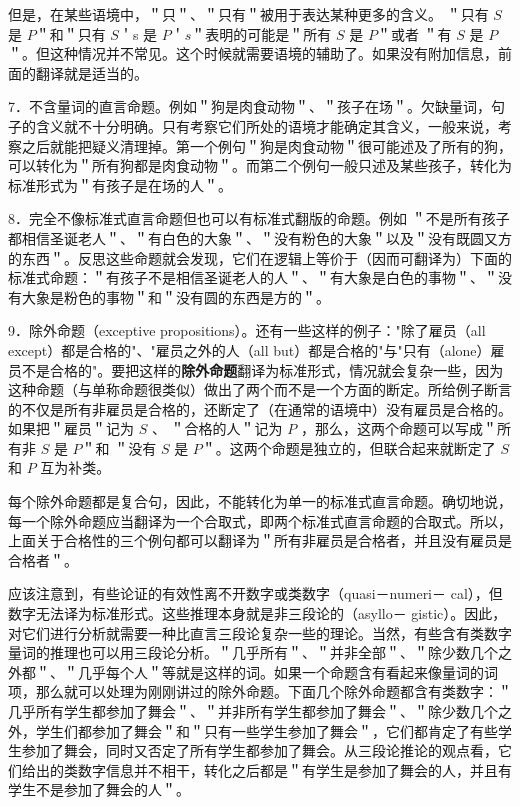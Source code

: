 但是，在某些语境中，＂只＂、＂只有＂被用于表达某种更多的含义。 ＂只有 $S$ 是 $P$＂和＂只有 $S$＇s 是 $P$＇$s$＂表明的可能是＂所有 $S$ 是 $P$＂或者 ＂有 $S$ 是 $P$＂。但这种情况并不常见。这个时候就需要语境的辅助了。如果没有附加信息，前面的翻译就是适当的。

7．不含量词的直言命题。例如＂狗是肉食动物＂、＂孩子在场＂。欠缺量词，句子的含义就不十分明确。只有考察它们所处的语境才能确定其含义，一般来说，考察之后就能把疑义清理掉。第一个例句＂狗是肉食动物＂很可能述及了所有的狗，可以转化为＂所有狗都是肉食动物＂。而第二个例句一般只述及某些孩子，转化为标准形式为＂有孩子是在场的人＂。

8．完全不像标准式直言命题但也可以有标准式翻版的命题。例如 ＂不是所有孩子都相信圣诞老人＂、＂有白色的大象＂、＂没有粉色的大象＂以及＂没有既圆又方的东西＂。反思这些命题就会发现，它们在逻辑上等价于（因而可翻译为）下面的标准式命题：＂有孩子不是相信圣诞老人的人＂、＂有大象是白色的事物＂、＂没有大象是粉色的事物＂和＂没有圆的东西是方的＂。

9．除外命题（exceptive propositions）。还有一些这样的例子："除了雇员（all except）都是合格的"、"雇员之外的人（all but）都是合格的"与"只有（alone）雇员不是合格的"。要把这样的\textbf{除外命题}翻译为标准形式，情况就会复杂一些，因为这种命题（与单称命题很类似）做出了两个而不是一个方面的断定。所给例子断言的不仅是所有非雇员是合格的，还断定了（在通常的语境中）没有雇员是合格的。如果把＂雇员＂记为 $S$ 、 ＂合格的人＂记为 $P$ ，那么，这两个命题可以写成＂所有非 $S$ 是 $P$＂和 ＂没有 $S$ 是 $P$＂。这两个命题是独立的，但联合起来就断定了 $S$ 和 $P$ 互为补类。

每个除外命题都是复合句，因此，不能转化为单一的标准式直言命题。确切地说，每一个除外命题应当翻译为一个合取式，即两个标准式直言命题的合取式。所以，上面关于合格性的三个例句都可以翻译为＂所有非雇员是合格者，并且没有雇员是合格者＂。

应该注意到，有些论证的有效性离不开数字或类数字（quasi－numeri－ cal），但数字无法译为标准形式。这些推理本身就是非三段论的（asyllo－ gistic）。因此，对它们进行分析就需要一种比直言三段论复杂一些的理论。当然，有些含有类数字量词的推理也可以用三段论分析。＂几乎所有＂、＂并非全部＂、＂除少数几个之外都＂、＂几乎每个人＂等就是这样的词。如果一个命题含有看起来像量词的词项，那么就可以处理为刚刚讲过的除外命题。下面几个除外命题都含有类数字：＂几乎所有学生都参加了舞会＂、＂并非所有学生都参加了舞会＂、＂除少数几个之外，学生们都参加了舞会＂和＂只有一些学生参加了舞会＂，它们都肯定了有些学生参加了舞会，同时又否定了所有学生都参加了舞会。从三段论推论的观点看，它们给出的类数字信息并不相干，转化之后都是＂有学生是参加了舞会的人，并且有学生不是参加了舞会的人＂。


